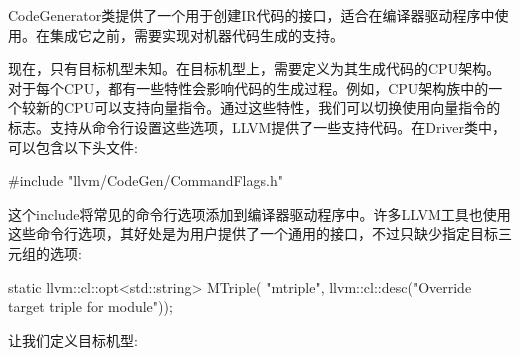 CodeGenerator类提供了一个用于创建IR代码的接口，适合在编译器驱动程序中使用。在集成它之前，需要实现对机器代码生成的支持。


现在，只有目标机型未知。在目标机型上，需要定义为其生成代码的CPU架构。对于每个CPU，都有一些特性会影响代码的生成过程。例如，CPU架构族中的一个较新的CPU可以支持向量指令。通过这些特性，我们可以切换使用向量指令的标志。支持从命令行设置这些选项，LLVM提供了一些支持代码。在Driver类中，可以包含以下头文件:

\begin{cpp}
#include "llvm/CodeGen/CommandFlags.h"
\end{cpp}

这个include将常见的命令行选项添加到编译器驱动程序中。许多LLVM工具也使用这些命令行选项，其好处是为用户提供了一个通用的接口，不过只缺少指定目标三元组的选项:

\begin{cpp}
static llvm::cl::opt<std::string> MTriple(
    "mtriple",
    llvm::cl::desc("Override target triple for module"));
\end{cpp}

让我们定义目标机型:

